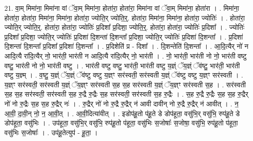 \documentclass[17pt]{extarticle}
\begin{document}
21. वा॒म् मिमा॑ना॒ मिमा॑ना वां ॅवा॒म् मिमा॑ना॒ होता॑रा॒ होता॑रा॒ मिमा॑ना वां ॅवा॒म् मिमा॑ना॒ होता॑रा । . मिमा॑ना॒ होता॑रा॒ होता॑रा॒ मिमा॑ना॒ मिमा॑ना॒ होता॑रा॒ ज्योति॒र् ज्योति॒र्॒. होता॑रा॒ मिमा॑ना॒ मिमा॑ना॒ होता॑रा॒ ज्योतिः॑ । . होता॑रा॒ ज्योति॒र् ज्योति॒र्॒. होता॑रा॒ होता॑रा॒ ज्योतिः॑ प्र॒दिशा᳚ प्र॒दिशा॒ ज्योति॒र्॒. होता॑रा॒ होता॑रा॒ ज्योतिः॑ प्र॒दिशा᳚ । . ज्योतिः॑ प्र॒दिशा᳚ प्र॒दिशा॒ ज्योति॒र् ज्योतिः॑ प्र॒दिशा॑ दि॒शन्ता॑ दि॒शन्ता᳚ प्र॒दिशा॒ ज्योति॒र् ज्योतिः॑ प्र॒दिशा॑ दि॒शन्ता᳚ । . प्र॒दिशा॑ दि॒शन्ता॑ दि॒शन्ता᳚ प्र॒दिशा᳚ प्र॒दिशा॑ दि॒शन्ता᳚ । . प्र॒दिशेति॑ प्र - दिशा᳚ । . दि॒शन्तेति॑ दि॒शन्ता᳚ । . आ॒दि॒त्यैर् नो॑ न आदि॒त्यै रा॑दि॒त्यैर् नो॒ भार॑ती॒ भार॑ती न आदि॒त्यै रा॑दि॒त्यैर् नो॒ भार॑ती । . नो॒ भार॑ती॒ भार॑ती नो नो॒ भार॑ती वष्टु वष्टु॒ भार॑ती नो नो॒ भार॑ती वष्टु । . भार॑ती वष्टु वष्टु॒ भार॑ती॒ भार॑ती वष्टु य॒ज्ञ्ं ॅय॒ज्ञ्ं ॅव॑ष्टु॒ भार॑ती॒ भार॑ती वष्टु य॒ज्ञ्म् । . व॒ष्टु॒ य॒ज्ञ्ं ॅय॒ज्ञ्ं ॅव॑ष्टु वष्टु य॒ज्ञ्ꣳ सर॑स्वती॒ सर॑स्वती य॒ज्ञ्ं ॅव॑ष्टु वष्टु य॒ज्ञ्ꣳ सर॑स्वती । . य॒ज्ञ्ꣳ सर॑स्वती॒ सर॑स्वती य॒ज्ञ्ं ॅय॒ज्ञ्ꣳ सर॑स्वती स॒ह स॒ह सर॑स्वती य॒ज्ञ्ं ॅय॒ज्ञ्ꣳ सर॑स्वती स॒ह । . सर॑स्वती स॒ह स॒ह सर॑स्वती॒ सर॑स्वती स॒ह रु॒द्रै रु॒द्रैः स॒ह सर॑स्वती॒ सर॑स्वती स॒ह रु॒द्रैः । . स॒ह रु॒द्रै रु॒द्रैः स॒ह स॒ह रु॒द्रैर् नो॑ नो रु॒द्रैः स॒ह स॒ह रु॒द्रैर् नः॑ । . रु॒द्रैर् नो॑ नो रु॒द्रै रु॒द्रैर् न॑ आवी दावीन् नो रु॒द्रै रु॒द्रैर् न॑ आवीत् । . न॒ आ॒वी॒ दा॒वी॒न् नो॒ न॒ आ॒वी॒त् । . आ॒वी॒दित्या॑वीत् । . इडोप॑हू॒तो प॑हू॒ते डे डोप॑हूता॒ वसु॑भि॒र् वसु॑भि॒ रुप॑हू॒ते डे डोप॑हूता॒ वसु॑भिः । . उप॑हूता॒ वसु॑भि॒र् वसु॑भि॒ रुप॑हू॒तो प॑हूता॒ वसु॑भिः स॒जोषाः᳚ स॒जोषा॒ वसु॑भि॒ रुप॑हू॒तो प॑हूता॒ वसु॑भिः स॒जोषाः᳚ । . उप॑हू॒तेत्युप॑ - हू॒ता॒ । \newline
\end{document}
